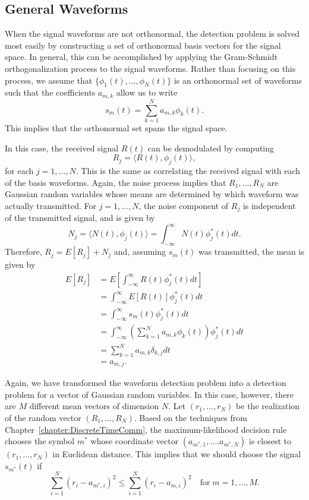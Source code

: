 \subsection{General Waveforms}

When the signal waveforms are not orthonormal, the detection problem is solved most easily by constructing a set of orthonormal basis vectors for the signal space.
In general, this can be accomplished by applying the Gram-Schmidt orthogonalization process to the signal waveforms.
Rather than focusing on this process, we assume that $\{ \phi_1 (t), \ldots , \phi_N (t) \}$ is an orthonormal set of waveforms such that the coefficients $a_{m,k}$ allow us to write
\[ s_m (t) = \sum_{k=1}^N a_{m,k} \phi_k (t). \]
This implies that the orthonormal set spans the signal space.

In this case, the received signal $R(t)$ can be demodulated by computing
\[ R_j = \langle R(t), \phi_j (t) \rangle, \]
for each $j=1,\ldots,N$.
This is the same as correlating the received signal with each of the basis waveforms.
Again, the noise process implies that $R_1 , \ldots, R_N$ are Gaussian random variables whose means are determined by which waveform was actually transmitted.
For $j=1,\ldots,N$, the noise component of $R_j$ is independent of the transmitted signal, and is given by
\[ N_j = \langle N(t), \phi_j (t) \rangle = \int_{-\infty}^{\infty} N(t) \phi_j^* (t) dt. \]
Therefore, $R_j = E[R_j] + N_j$ and, assuming $s_m (t)$ was transmitted, the mean is given by
\begin{align*}
E \left[R_j \right]
&= E \left[ \int_{-\infty}^{\infty} R(t) \phi_j^* (t) dt \right] \\
&= \int_{-\infty}^{\infty} E \left[ R(t) \right] \phi_j^* (t) dt \\
&= \int_{-\infty}^{\infty} s_m (t) \phi_j^* (t) dt \\
&= \int_{-\infty}^{\infty} \left( \sum_{k=1}^N a_{m,k} \phi_k (t) \right) \phi_j^* (t) dt \\
&= \sum_{k=1}^N a_{m,k} \delta_{k,j} dt \\
&= a_{m,j}. 
\end{align*}

Again, we have transformed the waveform detection problem into a detection problem for a vector of Gaussian random variables.
In this case, however, there are $M$ different mean vectors of dimension $N$.
Let $(r_1, \ldots, r_N)$ be the realization of the random vector $(R_1,\ldots,R_N)$.
Based on the techniques from Chapter~\ref{chapter:DiscreteTimeComm}, the maximum-likelihood decision rule chooses the symbol $m^*$ whose coordinate vector $(a_{m^*,1},\ldots. a_{m^*,N})$ is closest to $(r_1,\ldots,r_N )$ in Euclidean distance.
This implies that we should choose the signal $s_{m^*}(t)$ if
\[ \sum_{i=1}^N (r_i - a_{m^*,i})^2 \leq \sum_{i=1}^N (r_i - a_{m,i})^2 \quad \mathrm{for}\; m=1,\ldots,M. \]

